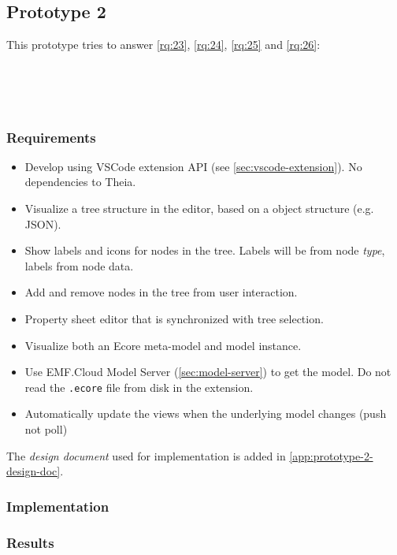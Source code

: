 \subsection{Prototype 2}

This prototype tries to answer \cref{rq:23}, \cref{rq:24}, \cref{rq:25} and \cref{rq:26}:
\begin{displayquote}
  \\
  \\
  \\
  
\end{displayquote}

\subsubsection{Requirements}

\begin{itemize}
  \item Develop using VSCode extension \acrshort{API} (see \cref{sec:vscode-extension}). No dependencies to Theia.
  \item Visualize a tree structure in the editor, based on a object structure (e.g. \gls{JSON}).
  \item Show labels and icons for nodes in the tree. Labels will be from node \emph{type}, labels from node data.
  \item Add and remove nodes in the tree from user interaction.
  \item Property sheet editor that is synchronized with tree selection.
  \item Visualize both an Ecore meta-model and model instance.
  \item Use EMF.Cloud Model Server (\cref{sec:model-server}) to get the model. Do not read the \texttt{.ecore} file from disk in the extension.
  \item Automatically update the views when the underlying model changes (push not poll)
\end{itemize}

The \textit{design document} used for implementation is added in \cref{app:prototype-2-design-doc}.

\subsubsection{Implementation}

\subsubsection{Results}

